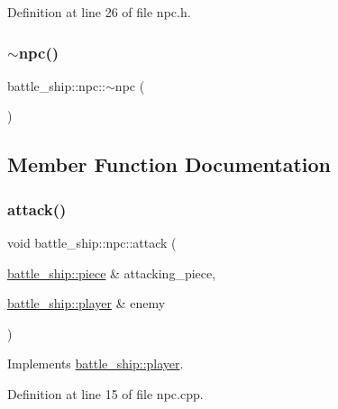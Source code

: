 Definition at line 26 of file npc.\+h.

\mbox{\label{classbattle__ship_1_1npc_ab548776b810769c0af009f1db0df4ede}} 
\subsubsection{\texorpdfstring{$\sim$npc()}{~npc()}}
{\footnotesize\ttfamily battle\+\_\+ship\+::npc\+::$\sim$npc (\begin{DoxyParamCaption}{ }\end{DoxyParamCaption})\hspace{0.3cm}{\ttfamily [default]}}



\subsection{Member Function Documentation}
\mbox{\label{classbattle__ship_1_1npc_abe6ec844c73c5410c2c4887fd50fac06}} 
\subsubsection{\texorpdfstring{attack()}{attack()}}
{\footnotesize\ttfamily void battle\+\_\+ship\+::npc\+::attack (\begin{DoxyParamCaption}\item[{\hyperlink{classbattle__ship_1_1piece}{battle\+\_\+ship\+::piece} \&}]{attacking\+\_\+piece,  }\item[{\hyperlink{classbattle__ship_1_1player}{battle\+\_\+ship\+::player} \&}]{enemy }\end{DoxyParamCaption})\hspace{0.3cm}{\ttfamily [virtual]}}



Implements \hyperlink{classbattle__ship_1_1player_a86be2256620cd5e20da6db7be8afdbc8}{battle\+\_\+ship\+::player}.



Definition at line 15 of file npc.\+cpp.

\mbox{\label{classbattle__ship_1_1npc_acb3ad1c27c948ae968697c795f10a6b9}} 
